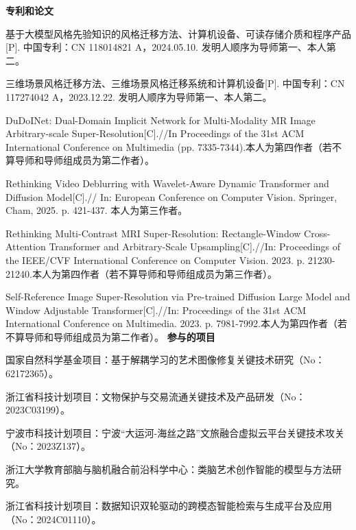 \cleardoublepage
{}

\noindent \textbf{专利和论文}
\par [1]基于大模型风格先验知识的风格迁移方法、计算机设备、可读存储介质和程序产品[P]. 中国专利：CN 118014821 A，2024.05.10. 发明人顺序为导师第一、本人第二。
\par [2]三维场景风格迁移方法、三维场景风格迁移系统和计算机设备[P]. 中国专利：CN 117274042 A，2023.12.22. 发明人顺序为导师第一、本人第二。
\par [3]DuDoINet: Dual-Domain Implicit Network for Multi-Modality MR Image Arbitrary-scale Super-Resolution[C].//In Proceedings of the 31st ACM International Conference on Multimedia (pp. 7335-7344).本人为第四作者（若不算导师和导师组成员为第二作者）。
\par [4]Rethinking Video Deblurring with Wavelet-Aware Dynamic Transformer and Diffusion Model[C].// In: European Conference on Computer Vision. Springer, Cham, 2025. p. 421-437. 本人为第三作者。
\par [5]Rethinking Multi-Contrast MRI Super-Resolution: Rectangle-Window Cross-Attention Transformer and Arbitrary-Scale Upsampling[C].//In: Proceedings of the IEEE/CVF International Conference on Computer Vision. 2023. p. 21230-21240.本人为第四作者（若不算导师和导师组成员为第三作者）。
\par [6]Self-Reference Image Super-Resolution via Pre-trained Diffusion Large Model and Window Adjustable Transformer[C].//In: Proceedings of the 31st ACM International Conference on Multimedia. 2023. p. 7981-7992.本人为第四作者（若不算导师和导师组成员为第二作者）。
\newline
\textbf{参与的项目}

\par [1] 国家自然科学基金项目：基于解耦学习的艺术图像修复关键技术研究（No：62172365）。
\par [2] 浙江省科技计划项目：文物保护与交易流通关键技术及产品研发（No：2023C03199）。
\par [3] 宁波市科技计划项目：宁波“大运河-海丝之路”文旅融合虚拟云平台关键技术攻关（No：2023Z137）。
\par [4] 浙江大学教育部脑与脑机融合前沿科学中心：类脑艺术创作智能的模型与方法研究。
\par [5] 浙江省科技计划项目：数据知识双轮驱动的跨模态智能检索与生成平台及应用（No：2024C01110）。


